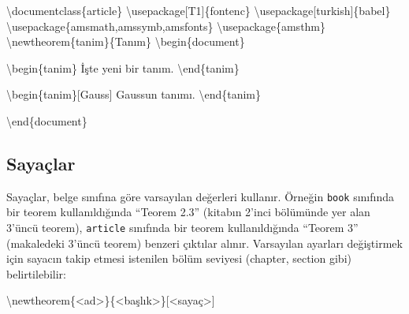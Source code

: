 \documentclass[
  letterpaper,
  DIV=11,
  numbers=noendperiod]{scrreprt}
\newenvironment{Shaded}{\begin{snugshade}}{\end{snugshade}}
\newcommand{\BuiltInTok}[1]{\textcolor[rgb]{0.00,0.23,0.31}{#1}}
\newcommand{\ExtensionTok}[1]{\textcolor[rgb]{0.00,0.23,0.31}{#1}}
\newcommand{\FunctionTok}[1]{\textcolor[rgb]{0.28,0.35,0.67}{#1}}
\newcommand{\KeywordTok}[1]{\textcolor[rgb]{0.00,0.23,0.31}{#1}}
\newcommand{\NormalTok}[1]{\textcolor[rgb]{0.00,0.23,0.31}{#1}}
\begin{document}
\begin{Shaded}
\begin{Highlighting}[]
\BuiltInTok{\textbackslash{}documentclass}\NormalTok{\{}\ExtensionTok{article}\NormalTok{\}}
\BuiltInTok{\textbackslash{}usepackage}\NormalTok{[T1]\{}\ExtensionTok{fontenc}\NormalTok{\}}
\BuiltInTok{\textbackslash{}usepackage}\NormalTok{[turkish]\{}\ExtensionTok{babel}\NormalTok{\}}
\BuiltInTok{\textbackslash{}usepackage}\NormalTok{\{}\ExtensionTok{amsmath,amssymb,amsfonts}\NormalTok{\}}
\BuiltInTok{\textbackslash{}usepackage}\NormalTok{\{}\ExtensionTok{amsthm}\NormalTok{\}}
\FunctionTok{\textbackslash{}newtheorem}\NormalTok{\{tanim\}\{Tanım\}}
\KeywordTok{\textbackslash{}begin}\NormalTok{\{}\ExtensionTok{document}\NormalTok{\}}

\KeywordTok{\textbackslash{}begin}\NormalTok{\{}\ExtensionTok{tanim}\NormalTok{\}}
\NormalTok{ İşte yeni bir tanım.}
\KeywordTok{\textbackslash{}end}\NormalTok{\{}\ExtensionTok{tanim}\NormalTok{\}}

\KeywordTok{\textbackslash{}begin}\NormalTok{\{}\ExtensionTok{tanim}\NormalTok{\}[Gauss]}
\NormalTok{ Gauss\textquotesingle{}un tanımı.}
\KeywordTok{\textbackslash{}end}\NormalTok{\{}\ExtensionTok{tanim}\NormalTok{\}}

\KeywordTok{\textbackslash{}end}\NormalTok{\{}\ExtensionTok{document}\NormalTok{\}}
\end{Highlighting}
\end{Shaded}

\hypertarget{sayauxe7lar}{%
\subsection{Sayaçlar}\label{sayauxe7lar}}

Sayaçlar, belge sınıfına göre varsayılan değerleri kullanır. Örneğin
\texttt{book} sınıfında bir teorem kullanıldığında ``Teorem 2.3''
(kitabın 2'inci bölümünde yer alan 3'üncü teorem), \texttt{article}
sınıfında bir teorem kullanıldığında ``Teorem 3'' (makaledeki 3'üncü
teorem) benzeri çıktılar alınır. Varsayılan ayarları değiştirmek için
sayacın takip etmesi istenilen bölüm seviyesi (chapter, section gibi)
belirtilebilir:

\begin{Shaded}
\begin{Highlighting}[]
\FunctionTok{\textbackslash{}newtheorem}\NormalTok{\{\textless{}ad\textgreater{}\}\{\textless{}başlık\textgreater{}\}[\textless{}sayaç\textgreater{}]}
\end{Highlighting}
\end{Shaded}
\end{document}
